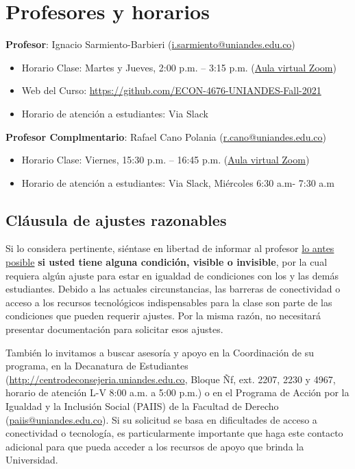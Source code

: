 \documentclass[11pt]{article}
\begin{document}
\section{Profesores y horarios} 

{\bf Profesor}: Ignacio Sarmiento-Barbieri (\href{mailto:i.sarmiento@uniandes.edu.co}{i.sarmiento@uniandes.edu.co})
\begin{itemize}
  \item Horario Clase: Martes y Jueves, 2:00 p.m. – 3:15 p.m. (\href{}{Aula virtual Zoom})
  \item Web del Curso: \url{https://github.com/ECON-4676-UNIANDES-Fall-2021}
\item Horario de atención a estudiantes: Via Slack 
\end{itemize}

{\bf Profesor Complmentario}: Rafael Cano Polania (\href{mailto:r.cano@uniandes.edu.co}{r.cano@uniandes.edu.co})
\begin{itemize}
	\item Horario Clase: Viernes, 15:30 p.m. – 16:45 p.m. (\href{}{Aula virtual Zoom})
	\item Horario de atención a estudiantes: Via Slack, Miércoles 6:30 a.m- 7:30 a.m
\end{itemize}



\subsection*{Cláusula de ajustes razonables}

Si lo considera pertinente, siéntase en libertad de informar al profesor \underline{lo antes posible} {\bf si usted tiene alguna condición, visible o invisible}, por la cual requiera algún ajuste para estar en igualdad de condiciones con los y las demás estudiantes. Debido a las actuales circunstancias, las barreras de conectividad o acceso a los recursos tecnológicos indispensables para la clase son parte de las condiciones que pueden requerir ajustes. Por la misma razón, no necesitará presentar documentación para solicitar esos ajustes. 

También lo invitamos a buscar asesoría y apoyo en la Coordinación de su programa, en la Decanatura de Estudiantes (\url{http://centrodeconsejeria.uniandes.edu.co}, Bloque Ñf, ext. 2207, 2230 y 4967, horario de atención L-V 8:00 a.m. a 5:00 p.m.) o en el Programa de Acción por la Igualdad y la Inclusión Social (PAIIS) de la Facultad de Derecho (\href{mailto:paiis@uniandes.edu.co}{paiis@uniandes.edu.co}). Si su solicitud se basa en dificultades de acceso a conectividad o tecnología, es particularmente importante que haga este contacto adicional para que pueda acceder a los recursos de apoyo que brinda la Universidad. 
\end{document}
